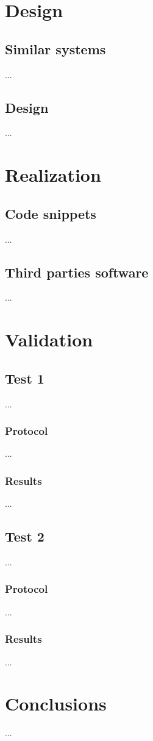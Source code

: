 \documentclass[binding=0.6cm,LaM]{sapthesis}
\begin{document}
	
	
\chapter{Design}
\section{Similar systems}
...
\section{Design}
...

\chapter{Realization}
\section{Code snippets}
...
\section{Third parties software}
...


\chapter{Validation}
\section{Test 1}
...
\subsection{Protocol}
...
\subsection{Results}
...
\section{Test 2}
...
\subsection{Protocol}
...
\subsection{Results}
...
\chapter{Conclusions}
...
\backmatter
\cleardoublepage
{} %


\end{document}
